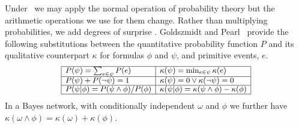 Under \zplus\ we may apply the normal operation
of probability theory
but the arithmetic operations we use for them change.  Rather than multiplying
probabilities, we add degrees of surprise%
.  Goldszmidt and
Pearl~ provide the following substitutions
between the quantitative probability function $P$ and its qualitative
counterpart $\kappa$ for formulas $\phi$ and $\psi$, and primitive events, $e$.
\begin{displaymath}
  \small
  \begin{array}{|l|l|}
    \hline
  P(\psi) = \sum_{e \in \psi} P(e) & \kappa(\psi) =
  \operatorname{min}_{e \in \psi} \kappa(e) \\ \hline
  P(\psi) + P(\neg \psi) = 1 & \kappa(\psi) = 0 \vee \kappa(\neg \psi) = 0
  \\ \hline
  P(\psi | \phi) = P(\psi \wedge \phi) / P(\phi) &
  \kappa(\psi | \phi) = \kappa(\psi \wedge \phi) - \kappa(\phi)
  \\ \hline
\end{array}
\end{displaymath}
\noindent
In a Bayes network, with conditionally independent $\omega$ and
$\phi$ we further have $\kappa(\omega \wedge \phi) = \kappa(\omega) + \kappa(\phi)$.

